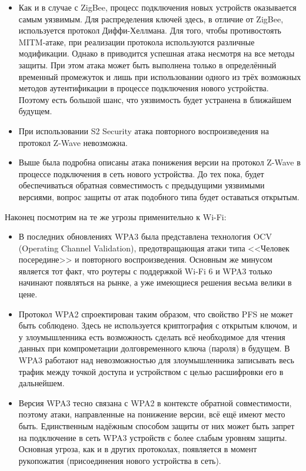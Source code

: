 	\begin{itemize}
		\item Как и в случае с ZigBee, процесс подключения новых устройств оказывается самым уязвимым.
		Для распределения ключей здесь, в отличие от ZigBee, используется протокол Диффи-Хеллмана. Для того,
		чтобы противостоять MITM-атаке, при реализации протокола используются различные модификации.
		Однако в \cite{formal-proof-of-z-wave-volnerability} приводится успешная атака несмотря на все методы 
		защиты. При этом атака может быть выполнена только в определённый временный промежуток и лишь
		при использовании одного из трёх возможных методов аутентификации в процессе подключения
		нового устройства. Поэтому есть большой шанс, что уязвимость будет устранена в ближайшем
		будущем.
		\item При использовании S2 Security атака повторного воспроизведения на протокол Z-Wave невозможна.
		\item Выше была подробна описаны атака понижения версии на протокол \newline Z-Wave в процессе подключения
		в сеть нового устройства. До тех пока, будет обеспечиваться обратная совместимость с предыдущими 
		уязвимыми версиями, вопрос защиты от атак подобного типа будет оставаться открытым.
	\end{itemize}

	Наконец посмотрим на те же угрозы применительно к Wi-Fi:
	
	\begin{itemize}
		\item В последних обновлениях WPA3 была представлена технология OCV (Operating Channel Validation),
		предотвращающая атаки типа <<Человек посередине>> и повторного воспроизведения. Основным же
		минусом является тот факт, что роутеры с поддержкой Wi-Fi 6 и WPA3 только начинают появляться
		на рынке, а уже имеющиеся решения весьма велики в цене.
		\item Протокол WPA2 спроектирован таким образом, что свойство PFS не может быть соблюдено.
		Здесь не используется криптография с открытым ключом, и у злоумышленника есть возможность
		сделать всё необходимое для чтения данных при компрометации долговременного ключа (пароля)
		в будущем. В WPA3 работают над невозможностью для злоумышленника записывать весь трафик
		между точкой доступа и устройством с целью расшифровки его в дальнейшем.
		\item Версия WPA3 тесно связана с WPA2 в контексте обратной совместимости, поэтому атаки,
		направленные на понижение версии, всё ещё имеют место быть. Единственным надёжным способом
		защиты от них может быть запрет на подключение в сеть WPA3 устройств с более слабым уровням
		защиты. Основная угроза, как и в других протоколах, появляется в момент рукопожатия (присоединения
		нового устройства в сеть).
	\end{itemize}

